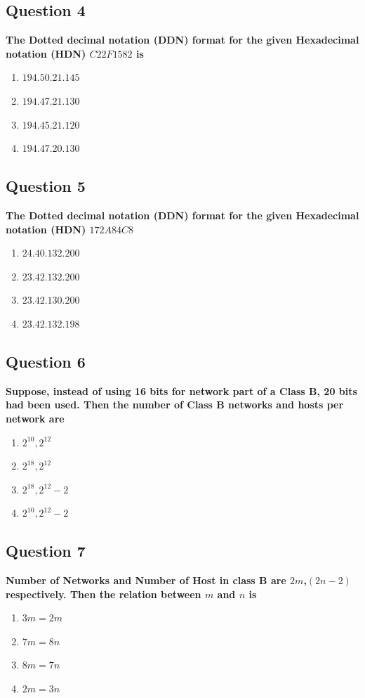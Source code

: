 \documentclass[12pt]{article}
\begin{document}
\subsection*{Question 4}
\textbf{The Dotted decimal notation (DDN) format for the given
Hexadecimal notation (HDN) $C22F1582$ is}
\begin{enumerate}[label=(\Alph*)]
    \item $194.50.21.145$
    \item $194.47.21.130$
    \item $194.45.21.120$
    \item $194.47.20.130$
\end{enumerate}

\subsection*{Question 5}
\textbf{The Dotted decimal notation (DDN) format for the given
Hexadecimal notation (HDN) $172A84C8$}
\begin{enumerate}[label=(\Alph*)]
    \item $24.40.132.200$
    \item $23.42.132.200$
    \item $23.42.130.200$
    \item $23.42.132.198$
\end{enumerate}

\subsection*{Question 6}
\textbf{Suppose, instead of using 16 bits for network part of a Class B, 20
bits had been used. Then the number of Class B networks and hosts
per network are}
\begin{enumerate}[label=(\Alph*)]
    \item $2^{10}, 2^{12}$
    \item $2^{18}, 2^{12}$
    \item $2^{18}, 2^{12} - 2$
    \item $2^{10}, 2^{12} - 2$
\end{enumerate}

\subsection*{Question 7}
\textbf{Number of Networks and Number of Host in class B are $2m$,$(2n - 2)$ respectively. Then the relation between $m$ and $n$ is}
\begin{enumerate}[label=(\Alph*)]
    \item $3m=2m$
    \item $7m=8n$
    \item $8m=7n$
    \item $2m=3n$
\end{enumerate}
\end{document}
